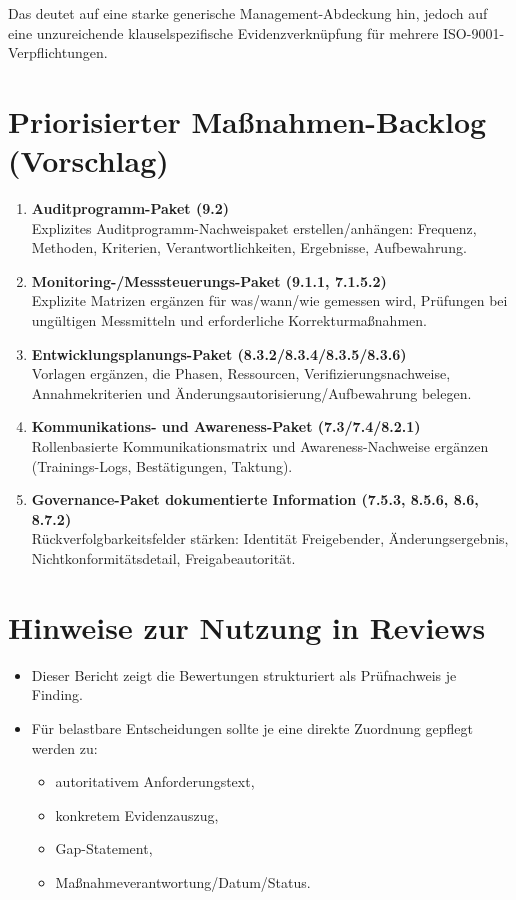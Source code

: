 \documentclass[11pt,a4paper]{article}
\newcommand{\coded}[1]{\texttt{\detokenize{#1}}}
\begin{document}
Das deutet auf eine starke generische Management-Abdeckung hin, jedoch auf eine unzureichende klauselspezifische Evidenzverknüpfung für mehrere ISO-9001-Verpflichtungen.

\section{Priorisierter Maßnahmen-Backlog (Vorschlag)}

\begin{enumerate}[leftmargin=*]
  \item \textbf{Auditprogramm-Paket (9.2)} \\
    Explizites Auditprogramm-Nachweispaket erstellen/anhängen: Frequenz, Methoden, Kriterien, Verantwortlichkeiten, Ergebnisse, Aufbewahrung.
  \item \textbf{Monitoring-/Messsteuerungs-Paket (9.1.1, 7.1.5.2)} \\
    Explizite Matrizen ergänzen für was/wann/wie gemessen wird, Prüfungen bei ungültigen Messmitteln und erforderliche Korrekturmaßnahmen.
  \item \textbf{Entwicklungsplanungs-Paket (8.3.2/8.3.4/8.3.5/8.3.6)} \\
    Vorlagen ergänzen, die Phasen, Ressourcen, Verifizierungsnachweise, Annahmekriterien und Änderungsautorisierung/Aufbewahrung belegen.
  \item \textbf{Kommunikations- und Awareness-Paket (7.3/7.4/8.2.1)} \\
    Rollenbasierte Kommunikationsmatrix und Awareness-Nachweise ergänzen (Trainings-Logs, Bestätigungen, Taktung).
  \item \textbf{Governance-Paket dokumentierte Information (7.5.3, 8.5.6, 8.6, 8.7.2)} \\
    Rückverfolgbarkeitsfelder stärken: Identität Freigebender, Änderungsergebnis, Nichtkonformitätsdetail, Freigabeautorität.
\end{enumerate}

\section{Hinweise zur Nutzung in Reviews}

\begin{itemize}[leftmargin=*]
  \item Dieser Bericht zeigt die Bewertungen strukturiert als Prüfnachweis je Finding.
  \item Für belastbare Entscheidungen sollte je \coded{ru\_key} eine direkte Zuordnung gepflegt werden zu:
    \begin{itemize}[leftmargin=*]
      \item autoritativem Anforderungstext,
      \item konkretem Evidenzauszug,
      \item Gap-Statement,
      \item Maßnahmeverantwortung/Datum/Status.
    \end{itemize}
\end{itemize}
\end{document}
